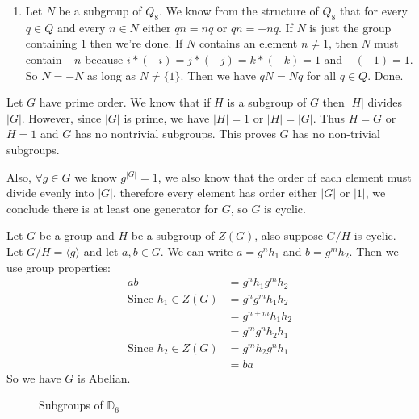 \documentclass[12pt]{report}
\begin{document}
\begin{enumerate}
  \item Let $N$ be a subgroup of $Q_8$. We know from the structure of $Q_8$ that
        for every $q \in Q$ and every $n \in N$ either $qn = nq$ or $qn = -nq$.
        If $N$ is just the group containing $1$ then we're done. If $N$ contains
        an element $n \neq 1$, then $N$ must contain $-n$ because $i*(-i) =
        j*(-j) = k*(-k) = 1$ and $-(-1) = 1$. So $N = -N$ as long as
        $N \neq \{ 1\}$. Then we have $qN = Nq$ for all $q \in Q$. Done.

\end{enumerate}

Let $G$ have prime order. We know that if $H$ is a subgroup of $G$ then $|H|$
divides $|G|$. However, since $|G|$ is prime, we have $|H| = 1$ or $|H| = |G|$.
Thus $H = G$ or $H = 1$ and $G$ has no nontrivial subgroups. This proves $G$ has
no non-trivial subgroups.

Also, $\forall g\in G$ we know $g^|G| = 1$, we also know that the order of each
element must divide evenly into $|G|$, therefore every element has order either
$|G|$ or $|1|$, we conclude there is at least one generator for $G$, so $G$ is
cyclic.


Let $G$ be a group and $H$ be a subgroup of $Z(G)$, also suppose $G/H$ is
cyclic. Let $G/H = \langle g \rangle$ and let $a,b \in G$. We can write $a =
g^nh_1$ and $b = g^mh_2$. Then we use group properties:
\begin{align*}
 ab                            &= g^nh_1g^mh_2 \\
\textrm{Since $h_1 \in Z(G) $} &= g^ng^mh_1h_2 \\
                               &= g^{n+m}h_1h_2\\
                               &= g^mg^nh_2h_1 \\
\textrm{Since $h_2 \in Z(G) $} &= g^mh_2g^nh_1 \\
                               &= ba
\end{align*}
So we have $G$ is Abelian.\\


\begin{figure}[h]
  \centering
{}
\caption{Subgroups of $\mathbb{D}_{6}$}
\end{figure}
\end{document}
